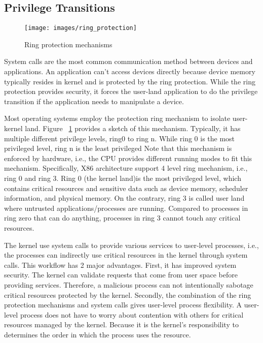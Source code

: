 \subsection{Privilege Transitions}
\begin{figure}[H]
  \centering
  \texttt{[image: images/ring\_protection]}
  \caption[Ring protection mechanisms]{Ring protection mechanisms}
  \label{fig:ring_protection}
\end{figure}
System calls are the most common communication method between devices and applications.  
An application can't access devices directly because device memory typically resides in 
 kernel and is protected by the ring protection.  While the ring protection provides security, 
 it forces the user-land application to do the privilege transition if the application needs to 
 manipulate a device.



 Most operating systems employ the protection ring mechanism to isolate user-kernel land. 
 Figure ~\ref{fig:ring_protection} provides a sketch of this mechanism. Typically, it has multiple different privilege levels, 
 ring0 to ring n. While ring 0 is the most privileged level, ring n is the least privileged
 Note that this mechanism is enforced by hardware, i.e., the CPU provides different running modes 
 to fit this mechanism.  Specifically, X86 architecture support 4 level ring mechanism, i.e., 
 ring 0 and ring 3.  Ring 0 (the kernel land)is the most privileged level, which contains critical 
 resources and sensitive data such as device memory, scheduler information, and physical memory. 
 On the contrary, ring 3 is called user land where untrusted applications/processes are running.  
 Compared to processes in ring zero that can do anything, processes in ring 3 cannot touch any 
 critical resources.


 The kernel use system calls to provide various services to user-level processes, i.e., the processes 
 can indirectly use critical resources in the kernel through system calls. This workflow has 2 major 
 advantages. First, it has improved system security. The kernel can validate requests that come from 
 user space before providing services. Therefore, a malicious process can not intentionally sabotage 
 critical resources protected by the kernel. Secondly, the combination of the ring protection 
 mechanisms and system calls gives user-level process flexibility. A user-level process does not 
 have to worry about contention with others for critical resources managed by the kernel. Because 
 it is the kernel's responsibility to determines the order in which the process uses the resource. 
 

